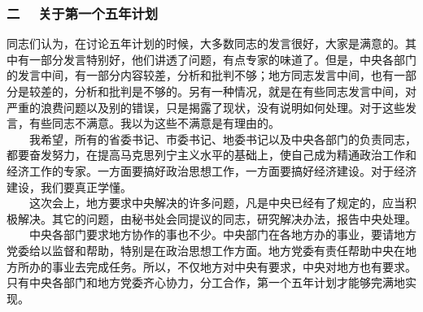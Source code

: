\documentclass[cn,11pt,chinese]{elegantbook}
\def\myformat#1{\hfil\hfil #1}
\begin{document}
\subsubsection*{\myformat{二　  关于第一个五年计划}}
同志们认为，在讨论五年计划的时候，大多数同志的发言很好，大家是满意的。其中有一部分发言特别好，他们讲透了问题，有点专家的味道了。但是，中央各部门的发言中间，有一部分内容较差，分析和批判不够；地方同志发言中间，也有一部分是较差的，分析和批判是不够的。另有一种情况，就是在有些同志发言中间，对严重的浪费问题以及别的错误，只是揭露了现状，没有说明如何处理。对于这些发言，有些同志不满意。我以为这些不满意是有理由的。\\
　　我希望，所有的省委书记、市委书记、地委书记以及中央各部门的负责同志，都要奋发努力，在提高马克思列宁主义水平的基础上，使自己成为精通政治工作和经济工作的专家。一方面要搞好政治思想工作，一方面要搞好经济建设。对于经济建设，我们要真正学懂。\\
　　这次会上，地方要求中央解决的许多问题，凡是中央已经有了规定的，应当积极解决。其它的问题，由秘书处会同提议的同志，研究解决办法，报告中央处理。\\
　　中央各部门要求地方协作的事也不少。中央部门在各地方办的事业，要请地方党委给以监督和帮助，特别是在政治思想工作方面。地方党委有责任帮助中央在地方所办的事业去完成任务。所以，不仅地方对中央有要求，中央对地方也有要求。只有中央各部门和地方党委齐心协力，分工合作，第一个五年计划才能够完满地实现。\\
\end{document}
